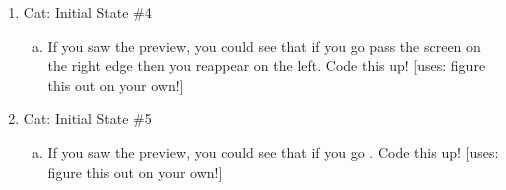 \documentclass[11pt]{article}
\begin{document}
\begin{enumerate}
\item Cat: Initial State \#4
\begin{enumerate}[a.]
\item If you saw the preview, you could see that if you go pass the screen on the right edge then you reappear on the left. Code this up! [uses: figure this out on your own!]
\end{enumerate}

\item Cat: Initial State \#5
\begin{enumerate}[a.]
\item If you saw the preview, you could see that if you go . Code this up! [uses: figure this out on your own!]
\end{enumerate}
\end{enumerate}
\end{document}
